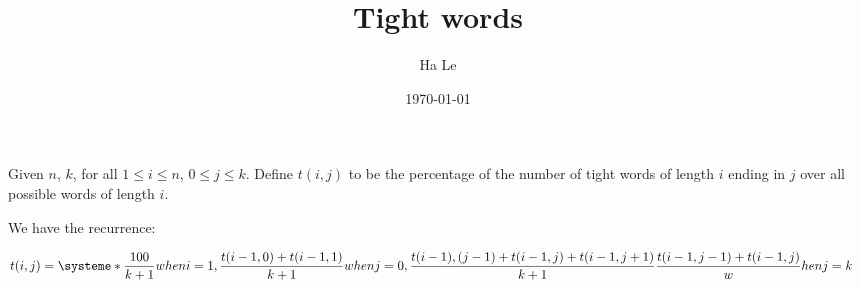 \documentclass{article}
\begin{document}
 
\title{Tight words} 
\author{Ha Le} 
\date{\today} 
\maketitle 

Given $n$, $k$, for all $1 \leq i \leq n$, $0 \leq j \leq k$. Define $t(i, j)$ to be the percentage of the number of tight words of length $i$ ending in $j$ over all possible words  of length $i$.

We have the recurrence:

\begin{align*}
t(i, j) &= \systeme*{
	\frac{100}{k + 1} when i = 1,
	\frac{t(i - 1, 0) + t(i - 1, 1)}{k + 1} when j = 0,
	\frac{t(i - 1), (j - 1) + t(i - 1, j) + t(i - 1, j + 1)}{k + 1}
	\frac{t(i - 1, j - 1) + t(i - 1, j)} when j = k
}
\end{align*}
\end{document}
